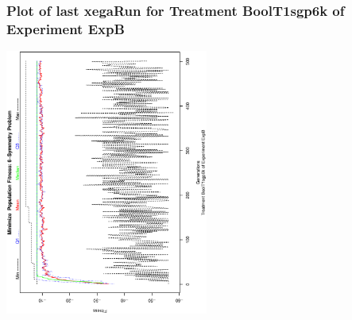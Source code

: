 \begin{frame}
 \frametitle{ Plot of last xegaRun for Treatment BoolT1sgp6k of Experiment ExpB }
 \begin{center}
\includegraphics[width=0.5\textwidth, angle=-90]
{ExpBPlotPopStatsFigure009.eps}
 \end{center}
 \label{report/ExpBPlotPopStatsFigure009.eps}  
 \end{frame}


